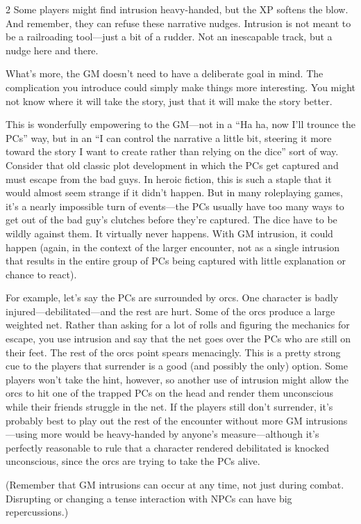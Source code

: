 \begin{multicols}{2}
Some players might find intrusion heavy-handed, but the XP softens the blow. And remember, they can refuse these narrative nudges. Intrusion is not meant to be a railroading tool—just a bit of a rudder. Not an inescapable track, but a nudge here and there.

What’s more, the GM doesn’t need to have a deliberate goal in mind. The complication you introduce could simply make things more interesting. You might not know where it will take the story, just that it will make the story better.

This is wonderfully empowering to the GM—not in a “Ha ha, now I’ll trounce the PCs” way, but in an “I can control the narrative a little bit, steering it more toward the story I want to create rather than relying on the dice” sort of way. Consider that old classic plot development in which the PCs get captured and must escape from the bad guys. In heroic fiction, this is such a staple that it would almost seem strange if it didn’t happen. But in many roleplaying games, it’s a nearly impossible turn of events—the PCs usually have too many ways to get out of the bad guy’s clutches before they’re captured. The dice have to be wildly against them. It virtually never happens. With GM intrusion, it could happen (again, in the context of the larger encounter, not as a single intrusion that results in the entire group of PCs being captured with little explanation or chance to react).

For example, let’s say the PCs are surrounded by orcs. One character is badly injured—debilitated—and the rest are hurt. Some of the orcs produce a large weighted net. Rather than asking for a lot of rolls and figuring the mechanics for escape, you use intrusion and say that the net goes over the PCs who are still on their feet. The rest of the orcs point spears menacingly. This is a pretty strong cue to the players that surrender is a good (and possibly the only) option. Some players won’t take the hint, however, so another use of intrusion might allow the orcs to hit one of the trapped PCs on the head and render them unconscious while their friends struggle in the net. If the players still don’t surrender, it’s probably best to play out the rest of the encounter without more GM intrusions—using more would be heavy-handed by anyone’s measure—although it’s perfectly reasonable to rule that a character rendered debilitated is knocked unconscious, since the orcs are trying to take the PCs alive.

(Remember that GM intrusions can occur at any time, not just during combat. Disrupting or changing a tense interaction with NPCs can have big repercussions.)


\end{multicols}
